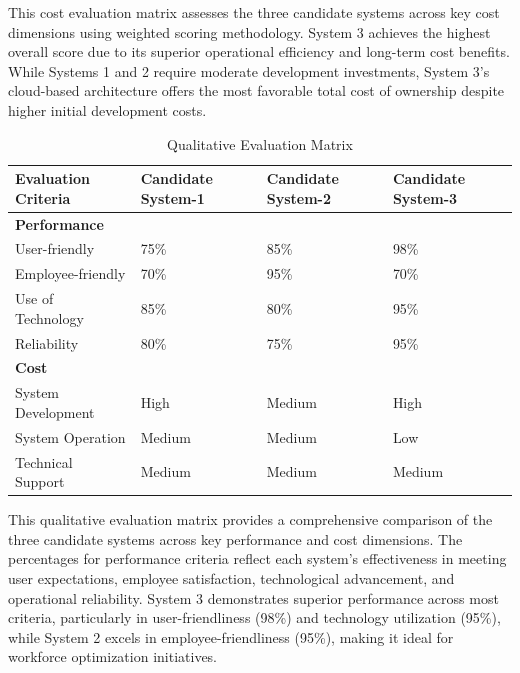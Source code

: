 \documentclass[12pt,a4paper]{article}
\begin{document}
This cost evaluation matrix assesses the three candidate systems across key cost dimensions using weighted scoring methodology. System 3 achieves the highest overall score due to its superior operational efficiency and long-term cost benefits. While Systems 1 and 2 require moderate development investments, System 3's cloud-based architecture offers the most favorable total cost of ownership despite higher initial development costs.


\begin{table}[h]
\centering
\caption{Qualitative Evaluation Matrix}
\begin{tabular}{|p{4.5cm}|p{3cm}|p{3cm}|p{3cm}|}
\hline
\textbf{Evaluation Criteria} & \textbf{Candidate System-1} & \textbf{Candidate System-2} & \textbf{Candidate System-3} \\ \hline

\multicolumn{4}{|l|}{\textbf{Performance}} \\ \hline

User-friendly & 75\% & 85\% & 98\% \\ \hline

Employee-friendly & 70\% & 95\% & 70\% \\ \hline

Use of Technology & 85\% & 80\% & 95\% \\ \hline

Reliability & 80\% & 75\% & 95\% \\ \hline

\multicolumn{4}{|l|}{\textbf{Cost}} \\ \hline

System Development & High & Medium & High \\ \hline

System Operation & Medium & Medium & Low \\ \hline

Technical Support & Medium & Medium & Medium \\ \hline
\end{tabular}
\end{table}

This qualitative evaluation matrix provides a comprehensive comparison of the three candidate systems across key performance and cost dimensions. The percentages for performance criteria reflect each system's effectiveness in meeting user expectations, employee satisfaction, technological advancement, and operational reliability. System 3 demonstrates superior performance across most criteria, particularly in user-friendliness (98\%) and technology utilization (95\%), while System 2 excels in employee-friendliness (95\%), making it ideal for workforce optimization initiatives.
\end{document}
